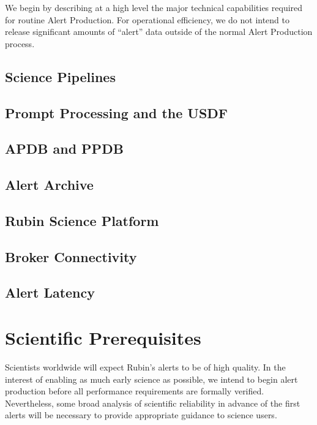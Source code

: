 \documentclass[OPS,authoryear,toc]{lsstdoc}
\begin{document}
We begin by describing at a high level the major technical capabilities required for routine Alert Production.
For operational efficiency, we do not intend to release significant amounts of ``alert'' data outside of the normal Alert Production process.

\subsection{Science Pipelines}

\subsection{Prompt Processing and the USDF}

\subsection{APDB and PPDB}

\subsection{Alert Archive}

\subsection{Rubin Science Platform}

\subsection{Broker Connectivity}

\subsection{Alert Latency}

\section{Scientific Prerequisites}

Scientists worldwide will expect Rubin's alerts to be of high quality.
In the interest of enabling as much early science as possible, we intend to begin alert production before all performance requirements are formally verified.  
Nevertheless, some broad analysis of scientific reliability in advance of the first alerts will be necessary to provide appropriate guidance to science users.
\end{document}
